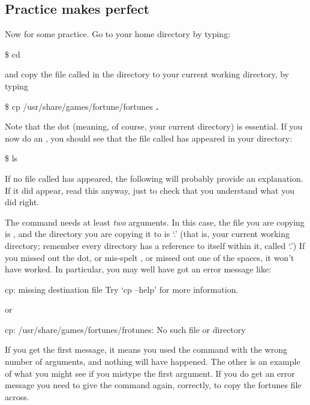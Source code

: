%
%


\subsection{Practice makes perfect}
Now for some practice. Go to your home directory by typing:
%
\begin{ttoutenv}
\$  cd \return
\end{ttoutenv}
%
and copy the file called  in the 
directory to your current working directory, by typing

\begin{ttoutenv}
\$  cp /usr/share/games/fortune/fortunes \textbf{.}  \return
\end{ttoutenv}
%
Note that the dot (meaning, of course, your current directory) is
essential.  If you now do an , you should see that the
file called  has appeared in your directory:

\begin{ttoutenv}
\$  ls \return
\end{ttoutenv}

If no file called  has appeared, the following will
probably provide an explanation. If it did appear, read this anyway, just to
check that you understand what you did right.

The  command needs at least \emph{two} arguments. In this case, the file
you are copying is , and the directory
you are copying it to is `.' (that is, your current working
directory; remember every directory has a reference to itself within
it, called `.') If you missed out the dot, or mis-spelt
, or missed out one of the spaces, it
won't have worked. In particular, you may well have got an error message like:
%
\begin{ttoutenv}
  cp: missing destination file
  Try `cp --help' for more information.
\end{ttoutenv}
%
or
\begin{ttoutenv}
  cp: /usr/share/games/fortunes/frotunes: No such file or directory
\end{ttoutenv}
%
If you get the first message, it means you used the command with the
wrong number of arguments, and nothing will have happened.
The other is an example of what you might see if you mistype the first
argument. If you do get an error message you need to give the command again,
correctly, to copy the fortunes file across.


